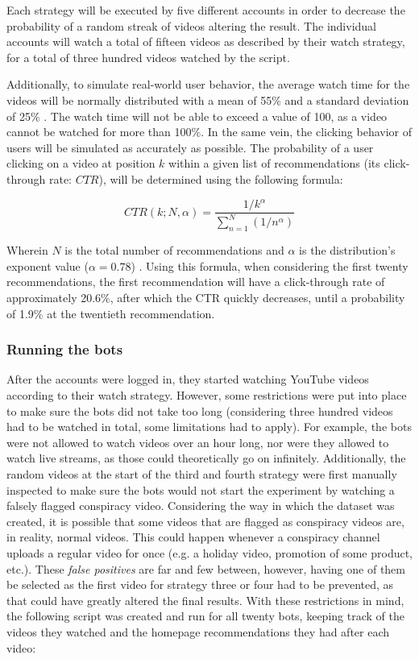\documentclass[../main.tex]{subfiles}
\begin{document}
Each strategy will be executed by five different accounts in order to decrease the probability of a 
random streak of videos altering the result. The individual accounts will watch a total of fifteen
videos as described by their watch strategy, for a total of three hundred videos watched by the script. 

Additionally, to simulate real-world user behavior, the average watch time for the videos will be normally
distributed with a mean of 55\% and a standard deviation of 25\% \citep{park2016data, lang_2018}. The 
watch time will not be able to exceed a value of 100, as a video cannot be watched for more than 100\%. In 
the same vein, the clicking behavior of users will be simulated as accurately as possible. The probability 
of a user clicking on a video at position $k$ within a given list of recommendations (its click-through 
rate: $CTR$), will be determined using the following formula:

\begin{equation}
CTR(k; N, \alpha) = \frac{1/k^\alpha}{\sum_{n=1}^{N} (1/n^\alpha)}
\end{equation}

Wherein $N$ is the total number of recommendations and $\alpha$ is the distribution's exponent value ($\alpha
= 0.78$) \citep{zhou2010impact}. Using this formula, when considering the first twenty recommendations, the
first recommendation will have a click-through rate of approximately 20.6\%, after which the CTR quickly
decreases, until a probability of 1.9\% at the twentieth recommendation. 

\subsubsection{Running the bots}
After the accounts were logged in, they started watching YouTube videos according to their watch
strategy. However, some restrictions were put into place to make sure the bots did not take too long
(considering three hundred videos had to be watched in total, some limitations had to apply). For
example, the bots were not allowed to watch videos over an hour long, nor were they allowed to watch live
streams, as those could theoretically go on infinitely. Additionally, the random videos at the start of
the third and fourth strategy were first manually inspected to make sure the bots would not start the
experiment by watching a falsely flagged conspiracy video. Considering the way in which the dataset was
created, it is possible that some videos that are flagged as conspiracy videos are, in reality, normal 
videos. This could happen whenever a conspiracy channel uploads a regular video for once (e.g. a holiday 
video, promotion of some product, etc.). These \textit{false positives} are far and few between, however,
having one of them be selected as the first video for strategy three or four had to be prevented, as that
could have greatly altered the final results. With these restrictions in mind, the following script was 
created and run for all twenty bots, keeping track of the videos they watched and the homepage 
recommendations they had after each video:
\end{document}
